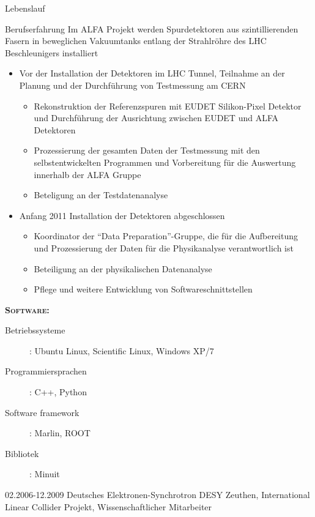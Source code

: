 \documentclass[11pt,a4paper]{scrartcl}
\begin{document}
\begin{cv}{Lebenslauf}
\begin{cvlist}{Berufserfahrung}
Im ALFA Projekt werden Spurdetektoren aus szintillierenden Fasern
in beweglichen Vakuumtanks entlang der Strahlr{\"o}hre des LHC
Beschleunigers installiert
\begin{itemize}
  \item Vor der Installation der Detektoren im LHC Tunnel, Teilnahme
  an der Planung und der Durchf{\"u}hrung von Testmessung am CERN
  \begin{itemize}
    \item Rekonstruktion der Referenzspuren mit EUDET Silikon-Pixel
    Detektor und Durchf{\"u}hrung der Ausrichtung zwischen EUDET
    und ALFA Detektoren
    \item Prozessierung der gesamten Daten der Testmessung mit den
    selbstentwickelten Programmen und Vorbereitung f{\"u}r die
    Auswertung innerhalb der ALFA Gruppe
    \item Beteligung an der Testdatenanalyse
  \end{itemize}
  \item Anfang 2011 Installation der Detektoren abgeschlossen
  \begin{itemize}
    \item Koordinator der "`Data Preparation"'-Gruppe, die
    f{\"u}r die Aufbereitung und Prozessierung der Daten f{\"u}r
    die Physikanalyse verantwortlich ist
    \item Beteiligung an der physikalischen Datenanalyse
    \item Pflege und weitere Entwicklung von Softwareschnittstellen
  \end{itemize}
\end{itemize}

{\scshape {\bfseries Software:}}
\begin{description}
\item[Betriebssysteme] : Ubuntu Linux, Scientific Linux, Windows
XP/7
\item[Programmiersprachen] : C++, Python
\item[Software framework] : Marlin, ROOT
\item[Bibliotek] : Minuit
\end{description}

\vspace{\baselineskip}

\item[02.2006-12.2009] Deutsches Elektronen-Synchrotron DESY Zeuthen,
International Linear Collider Projekt, Wissenschaftlicher Mitarbeiter \\


\end{cvlist}
\end{cv}
\end{document}
